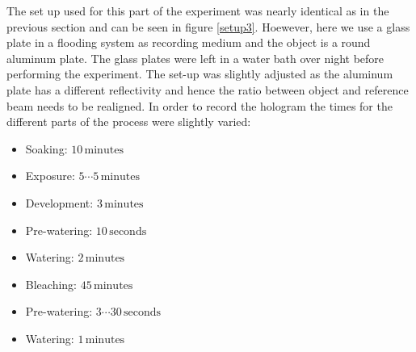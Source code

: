 The set up used for this part of the experiment was nearly identical as in the previous section and can be seen in figure \ref{setup3}. Hoewever, here we use a glass plate in a flooding system as recording medium and the object is a round aluminum plate. 
The glass plates were left in a water bath over night before performing the experiment. The set-up was slightly adjusted as the aluminum plate has a different reflectivity and hence the ratio  between object and reference beam needs to be realigned. In order to record the hologram the times for the different parts of the process were slightly varied:

\begin{itemize}
	\item Soaking:  $10\,\mathrm{minutes}$
	\item Exposure: $5 \cdots 5\,\mathrm{minutes}$
	\item Development: $3\,\mathrm{minutes}$
	\item Pre-watering: $10\,\mathrm{seconds}$
	\item Watering: $2\,\mathrm{minutes}$
	\item Bleaching: $45\,\mathrm{minutes}$
	\item Pre-watering: $3 \cdots 30\,\mathrm{seconds}$
	\item Watering: $1\,\mathrm{minutes}$
\end{itemize}


